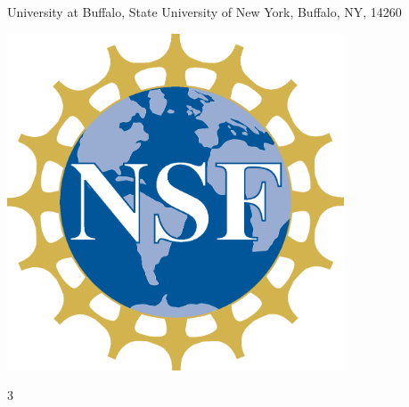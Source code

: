 \documentclass[landscape,a0b,final]{a0poster}
\newenvironment{poster}{
  \begin{center}
  \begin{minipage}[c]{0.98\textwidth}
}{
  \end{minipage} 
  \end{center}
}
\newenvironment{pcolumn}[1]{
  \begin{minipage}{#1\textwidth}
  \begin{center}
}{
  \end{center}
  \end{minipage}
}
\begin{document}
\begin{poster}
\begin{center}
\begin{pcolumn}{0.98}
{\begin{minipage}[c][9cm][c]{0.75\textwidth}
\begin{center}
{        \hspace{5cm}
        University at Buffalo, State University of New York, Buffalo, NY, 14260}
    \end{center}
    \end{minipage}
    \begin{minipage}[c][9cm][c]{0.01\linewidth}
    \begin{flushright}
        \hspace*{5cm}
        \includegraphics[width=10cm,angle=0]{figures/nsf4}
    \end{flushright}
    \end{minipage}
}
\end{pcolumn}
\end{center}

\vspace*{0.1cm} %


\begin{multicols}{3}


\end{multicols}
\end{poster}
\end{document}
